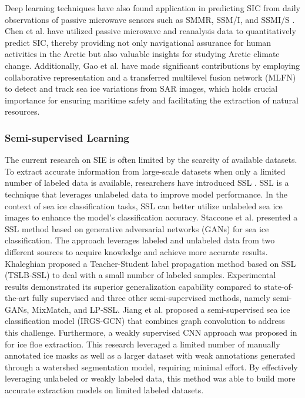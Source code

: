 Deep learning techniques have also found application in predicting SIC from daily observations of passive microwave sensors such as SMMR, SSM/I, and SSMI/S \cite{81kim2020prediction,82andersson2021seasonal,83zheng2022mid}. Chen et al. \cite{130chen2023predicting} have utilized passive microwave and reanalysis data to quantitatively predict SIC, thereby providing not only navigational assurance for human activities in the Arctic but also valuable insights for studying Arctic climate change. Additionally, Gao et al. \cite{113gao2018sea,114gao2019transferred} have made significant contributions by employing collaborative representation and a transferred multilevel fusion network (MLFN) to detect and track sea ice variations from SAR images, which holds crucial importance for ensuring maritime safety and facilitating the extraction of natural resources.


\subsubsection {Semi-supervised Learning}
The current research on SIE is often limited by the scarcity of available datasets. To extract accurate information from large-scale datasets when only a limited number of labeled data is available, researchers have introduced SSL \cite{103qi2020small}. SSL is a technique that leverages unlabeled data to improve model performance. In the context of sea ice classification tasks, SSL can better utilize unlabeled sea ice images to enhance the model's classification accuracy. Staccone et al. \cite{196staccone2020deep} presented a SSL method based on generative adversarial networks (GANs) for sea ice classification. The approach leverages labeled and unlabeled data from two different sources to acquire knowledge and achieve more accurate results. Khaleghian \cite{104khaleghian2021deep} proposed a Teacher-Student label propagation method based on SSL (TSLB-SSL) to deal with a small number of labeled samples. Experimental results demonstrated its superior generalization capability compared to state-of-the-art fully supervised and three other semi-supervised methods, namely semi-GANs, MixMatch, and LP-SSL. Jiang et al. \cite{27jiang2022semi} proposed a semi-supervised sea ice classification model (IRGS-GCN) that combines graph convolution to address this challenge. Furthermore, a weakly supervised CNN approach was proposed in \cite{149gonccalves2021fine} for ice floe extraction. This research leveraged a limited number of manually annotated ice masks as well as a larger dataset with weak annotations generated through a watershed segmentation model, requiring minimal effort. By effectively leveraging unlabeled or weakly labeled data, this method was able to build more accurate extraction models on limited labeled datasets.

